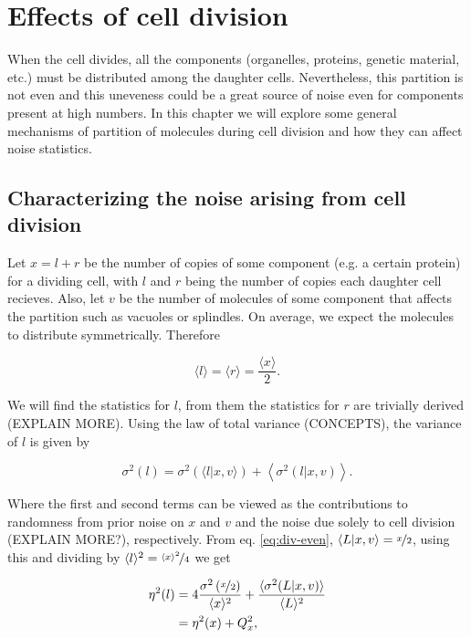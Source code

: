 \chapter{Effects of cell division}

When the cell divides, all the components (organelles, proteins, genetic material, etc.) must be distributed among the daughter cells. Nevertheless, this partition is not even and this uneveness could be a great source of noise even for components present at high numbers. In this chapter we will explore some general mechanisms of partition of molecules during cell division and how they can affect noise statistics.

\section{Characterizing the noise arising from cell division}

Let $x = l+r$ be the number of copies of some component (e.g. a certain protein) for a dividing cell, with $l$ and $r$ being the number of copies each daughter cell recieves. Also, let $v$ be the number of molecules of some component that affects the partition such as vacuoles or splindles. On average, we expect the molecules to distribute symmetrically. Therefore

\begin{equation}
  \label{eq:div-even}
  \langle l\rangle = \langle r\rangle = \frac{\langle x\rangle}{2}.
\end{equation}

We will find the statistics for $l$, from them the statistics for $r$ are trivially derived (EXPLAIN MORE). Using the law of total variance (CONCEPTS), the variance of $l$ is given by

\begin{equation}
  \sigma^2(l) = \sigma^2\left(\langle l|x,v\rangle\right) + \left\langle\sigma^2(l|x,v)\right\rangle.
\end{equation}

Where the first and second terms can be viewed as the contributions to randomness from prior noise on $x$ and $v$ and the noise due solely to cell division (EXPLAIN MORE?), respectively. From eq. \eqref{eq:div-even}, $\langle L|x,v\rangle = \nicefrac{x}{2}$, using this and dividing by $\langle l\rangle^2 = \nicefrac{\langle x\rangle^2}{4}$ we get

\begin{equation}
  \label{eq:div-noises}
  \begin{split}
    \eta^2(l) &= 4\frac{\sigma^2\left(\nicefrac{x}{2}\right)}{\langle x\rangle^2}+\frac{\langle\sigma^2(L|x,v)\rangle}{\langle L\rangle^2}\\
    &=\eta^2(x) + Q_x^2,
  \end{split}
\end{equation}

